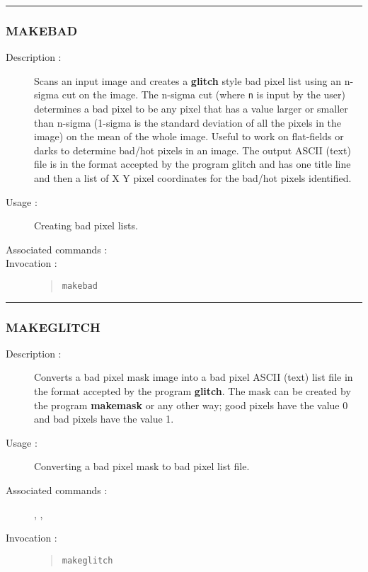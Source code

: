 \hrule
\subsubsection*{\label{MAKEBAD}MAKEBAD}

\begin{description}

\item[Description :] Scans an input image and creates a {\bf glitch}
style bad pixel list using an n-sigma cut on the image.  The n-sigma
cut (where {\tt n} is input by the user) determines a bad pixel to be
any pixel that has a value larger or smaller than n-sigma (1-sigma is
the standard deviation of all the pixels in the image) on the mean of
the whole image.  Useful to work on flat-fields or darks to determine
bad/hot pixels in an image.  The output ASCII (text) file is in the
format accepted by the program glitch and has one title line and then a
list of X Y pixel coordinates for the bad/hot pixels identified.

\item[Usage :] Creating bad pixel lists.
\item[Associated commands :] {\tt {}}
\item[Invocation :]

\begin{quote}{\tt  makebad }\end{quote}

\end{description}

\hrule
\subsubsection*{\label{MAKEGLITCH}MAKEGLITCH}

\begin{description}

\item[Description :] Converts a bad pixel mask image into a bad pixel
ASCII (text) list file in the format accepted by the program {\bf
glitch}.  The mask can be created by the program {\bf makemask} or any
other way; good pixels have the value 0 and bad pixels have the value
1.

\item[Usage :] Converting a bad pixel mask to bad pixel list file.

\item[Associated commands :] {\tt {}},
{\tt {}}, {\tt {}}

\item[Invocation :]

\begin{quote}{\tt  makeglitch }\end{quote}

\end{description}


